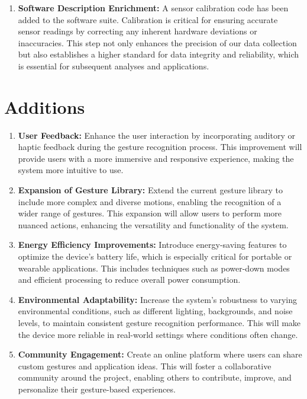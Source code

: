 \begin{enumerate}
\item \textbf{Software Description Enrichment:} 
A sensor calibration code has been added to the software suite. Calibration is critical for ensuring accurate sensor readings by correcting any inherent hardware deviations or inaccuracies. This step not only enhances the precision of our data collection but also establishes a higher standard for data integrity and reliability, which is essential for subsequent analyses and applications.

\end{enumerate}

\section{Additions}

\begin{enumerate}
	\item \textbf{User Feedback:} 
	Enhance the user interaction by incorporating auditory or haptic feedback during the gesture recognition process. This improvement will provide users with a more immersive and responsive experience, making the system more intuitive to use.
	
	\item \textbf{Expansion of Gesture Library:} 
	Extend the current gesture library to include more complex and diverse motions, enabling the recognition of a wider range of gestures. This expansion will allow users to perform more nuanced actions, enhancing the versatility and functionality of the system.
	
	\item \textbf{Energy Efficiency Improvements:} 
	Introduce energy-saving features to optimize the device's battery life, which is especially critical for portable or wearable applications. This includes techniques such as power-down modes and efficient processing to reduce overall power consumption.
	
	\item \textbf{Environmental Adaptability:} 
	Increase the system’s robustness to varying environmental conditions, such as different lighting, backgrounds, and noise levels, to maintain consistent gesture recognition performance. This will make the device more reliable in real-world settings where conditions often change.
	
	\item \textbf{Community Engagement:} 
	Create an online platform where users can share custom gestures and application ideas. This will foster a collaborative community around the project, enabling others to contribute, improve, and personalize their gesture-based experiences.
\end{enumerate}

